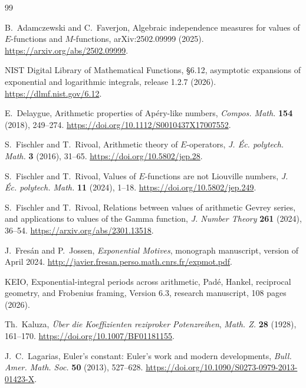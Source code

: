 \begin{thebibliography}{99}
\small
\raggedright

B.~Adamczewski and C.~Faverjon,
\newblock Algebraic independence measures for values of \(E\)-functions and
\(M\)-functions,
\newblock arXiv:2502.09999 (2025).
\newblock \url{https://arxiv.org/abs/2502.09999}.

NIST Digital Library of Mathematical Functions,
\newblock \S6.12, asymptotic expansions of exponential and logarithmic
integrals,
\newblock release 1.2.7 (2026).
\newblock \url{https://dlmf.nist.gov/6.12}.

E.~Delaygue,
\newblock Arithmetic properties of Ap\'ery-like numbers,
\newblock \emph{Compos. Math.} \textbf{154} (2018), 249--274.
\newblock \url{https://doi.org/10.1112/S0010437X17007552}.

S.~Fischler and T.~Rivoal,
\newblock Arithmetic theory of \(E\)-operators,
\newblock \emph{J. \'Ec. polytech. Math.} \textbf{3} (2016), 31--65.
\newblock \url{https://doi.org/10.5802/jep.28}.

S.~Fischler and T.~Rivoal,
\newblock Values of \(E\)-functions are not Liouville numbers,
\newblock \emph{J. \'Ec. polytech. Math.} \textbf{11} (2024), 1--18.
\newblock \url{https://doi.org/10.5802/jep.249}.

S.~Fischler and T.~Rivoal,
\newblock Relations between values of arithmetic Gevrey series, and
applications to values of the Gamma function,
\newblock \emph{J. Number Theory} \textbf{261} (2024), 36--54.
\newblock \url{https://arxiv.org/abs/2301.13518}.

J.~Fres\'an and P.~Jossen,
\newblock \emph{Exponential Motives},
\newblock monograph manuscript, version of April 2024.
\newblock \url{http://javier.fresan.perso.math.cnrs.fr/expmot.pdf}.

KEIO,
\newblock Exponential-integral periods across arithmetic, Pad\'e, Hankel,
reciprocal geometry, and Frobenius framing,
\newblock Version 6.3, research manuscript, 108 pages (2026).

Th.~Kaluza,
\newblock \emph{\"Uber die Koeffizienten reziproker Potenzreihen},
\newblock \emph{Math. Z.} \textbf{28} (1928), 161--170.
\newblock \url{https://doi.org/10.1007/BF01181155}.

J.~C.~Lagarias,
\newblock Euler's constant: Euler's work and modern developments,
\newblock \emph{Bull. Amer. Math. Soc.} \textbf{50} (2013), 527--628.
\newblock \url{https://doi.org/10.1090/S0273-0979-2013-01423-X}.


\end{thebibliography}
